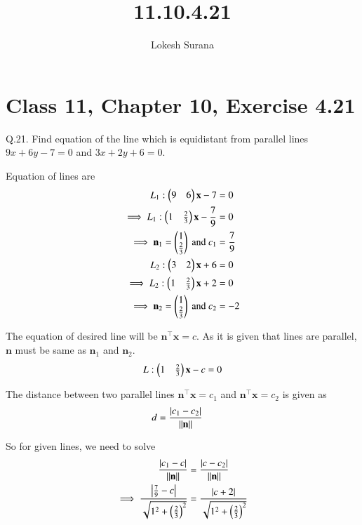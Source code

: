 \documentclass[journal,12pt,twocolumn]{IEEEtran}
\renewcommand{\vec}[1]{\boldsymbol{\mathbf{#1}}}
\begin{document}
\vspace{3cm}
\title{11.10.4.21}
\author{Lokesh Surana}
\maketitle
\section*{Class 11, Chapter 10, Exercise 4.21}

Q.21. Find equation of the line which is equidistant from parallel lines $9{x} + 6{y} - 7 = 0$ and $3{x} + 2{y} + 6 = 0$.

\solution Equation of lines are
\begin{align}
    {L}_1: \myvec{9&6}\vec{x} - 7 &= 0\\
    \implies {L}_1: \myvec{1&\frac{2}{3}}\vec{x} - \frac{7}{9} &= 0\\
    \implies \vec{n}_1 = \myvec{1\\\frac{2}{3}} \text{ and } {c}_1 &= \frac{7}{9}\\
    {L}_2: \myvec{3&2}\vec{x} + 6 &= 0\\
    \implies {L}_2: \myvec{1&\frac{2}{3}}\vec{x} + 2 &= 0\\
    \implies \vec{n}_2 = \myvec{1\\\frac{2}{3}} \text{ and } {c}_2 &= -2
\end{align}

The equation of desired line will be $\vec{n}^{\top}\vec{x} = c$.
As it is given that lines are parallel, $\vec{n}$ must be same as $\vec{n}_1$ and $\vec{n}_2$.
\begin{align}
	{L}: \myvec{1&\frac{2}{3}}\vec{x} - c = 0
\end{align}

The distance between two parallel lines $\vec{n}^{\top}\vec{x} = {c}_1$ and $\vec{n}^{\top}\vec{x} = {c}_2$ is given as
\begin{align}
	{d} &= \frac{\abs{{c}_1 - {c}_2}}{\norm{\vec{n}}}
\end{align}

So for given lines, we need to solve
\begin{align}
	\frac{\abs{{c}_1 - {c}}}{\norm{\vec{n}}} &= \frac{\abs{{c}-{c}_2}}{\norm{\vec{n}}}\\
	\implies \frac{\abs{\frac{7}{9} - {c}}}{{\sqrt{1^2 + \brak{\frac{2}{3}}^2}}} &= \frac{\abs{{c} + 2}}{{\sqrt{1^2 + \brak{\frac{2}{3}}^2}}}
\end{align}
\end{document}

